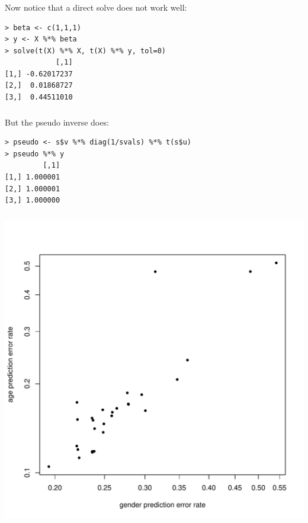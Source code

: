 \begin{frame}[fragile] \frametitle{}

Now notice that a direct solve does not work well:
\begin{verbatim}
> beta <- c(1,1,1)
> y <- X %*% beta
> solve(t(X) %*% X, t(X) %*% y, tol=0)
            [,1]
[1,] -0.62017237
[2,]  0.01868727
[3,]  0.44511010
\end{verbatim}

\end{frame}

\begin{frame}[fragile] \frametitle{}

But the pseudo inverse does:
\begin{verbatim}
> pseudo <- s$v %*% diag(1/svals) %*% t(s$u)
> pseudo %*% y
         [,1]
[1,] 1.000001
[2,] 1.000001
[3,] 1.000000
\end{verbatim}

\end{frame}



\begin{frame}[fragile] \frametitle{}

\begin{center}
\includegraphics[height=\textheight]{img/predFig.pdf}
\end{center}

\end{frame}


